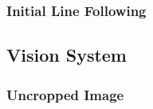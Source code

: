 \documentclass[11pt, hidelinks]{report}
\begin{document}
\subsubsection{Initial Line Following} \label{app:ogline}
    \begin{center}
    \end{center}

\subsection{Vision System} \label{app:vision}
\subsubsection{Uncropped Image} \label{app:uncrop}
	\begin{center}
	\end{center}
\end{document}
